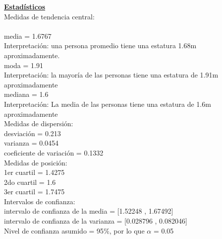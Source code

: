 \documentclass[a4paper,12pt]{article}
\begin{document}
\begin{enumerate}
\textbf{\underline{Estad\'isticos}} \\

Medidas de tendencia central:\\\\
media = 1.6767\\
Interpretaci\'on: una persona promedio tiene una estatura 1.68m aproximadamente.\\
moda =  1.91\\
Interpretaci\'on: la mayor\'ia de las personas tiene una estatura de 1.91m aproximadamente\\
mediana =  1.6\\
Interpretación: La media de las personas tiene una estatura de 1.6m aproximadamente\\

Medidas de dispersi\'on:\\
desviaci\'on = 0.213\\
varianza = 0.0454\\
coeficiente de variaci\'on = 0.1332\\

Medidas de posici\'on:\\
1er cuartil = 1.4275\\
2do cuartil = 1.6\\
3er cuartil = 1.7475\\

Intervalos de confianza:\\
intervalo de confianza de la media = [1.52248 ,  1.67492]\\
intervalo de confianza de la varianza = [0.028796 ,  0.082046]\\
Nivel de confianza asumido = 95$\%$, por lo que $\alpha$ = 0.05\\\\

\end{enumerate}
\end{document}
